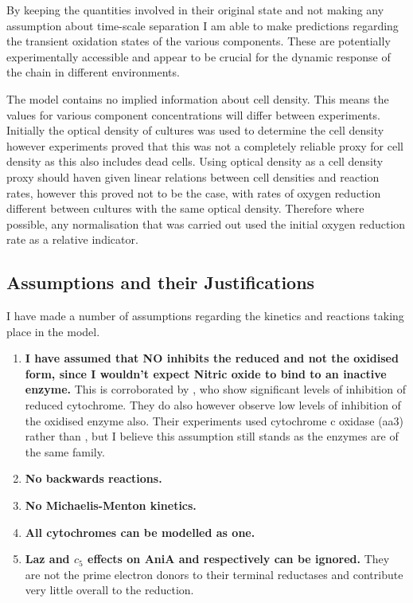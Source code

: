 By keeping the quantities involved in their original state and not making any assumption about time-scale separation I am able to make predictions regarding the transient oxidation states of the various components. These are potentially experimentally accessible and appear to be crucial for the dynamic response of the chain in different environments.

The model contains no implied information about cell density. This means the values for various component concentrations will differ between experiments. Initially the optical density of cultures was used to determine the cell density however experiments proved that this was not a completely reliable proxy for cell density as this also includes dead cells. Using optical density as a cell density proxy should haven given linear relations between cell densities and reaction rates, however this proved not to be the case, with rates of oxygen reduction different between cultures with the same optical density. Therefore where possible, any normalisation that was carried out used the initial oxygen reduction rate as a relative indicator.

\subsection{Assumptions and their Justifications}
I have made a number of assumptions regarding the kinetics and reactions taking place in the model.
\begin{enumerate}
 \item {\bf I have assumed that NO inhibits the reduced \cbbthree{} and not the oxidised form, since I wouldn't expect Nitric oxide to bind to an inactive enzyme.} This is corroborated by \citet{Giuffre2000}, who show significant levels of inhibition of reduced cytochrome. They do also however observe low levels of inhibition of the oxidised enzyme also. Their experiments used cytochrome c oxidase (aa3) rather than \cbbthree{}, but I believe this assumption still stands as the enzymes are of the same family.
 \item {\bf No backwards reactions.}
 \item {\bf No Michaelis-Menton kinetics.}
 \item {\bf All cytochromes can be modelled as one.}
 \item {\bf Laz and $c_5$ effects on AniA and \cbbthree{} respectively can be ignored.} They are not the prime electron donors to their terminal reductases and contribute very little overall to the reduction\cite{Deeudom2007}.
\end{enumerate}


